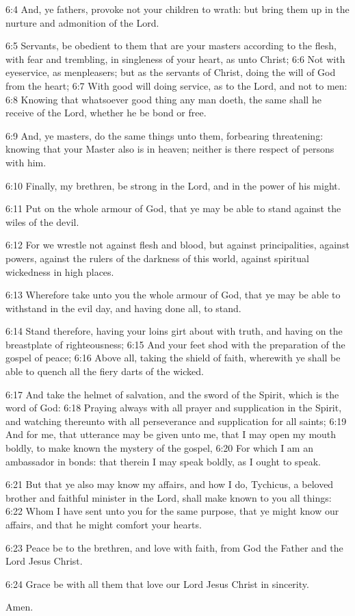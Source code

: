 6:4 And, ye fathers, provoke not your children to wrath: but bring them up in the nurture and admonition of the Lord.

6:5 Servants, be obedient to them that are your masters according to the flesh, with fear and trembling, in singleness of your heart, as unto Christ; 6:6 Not with eyeservice, as menpleasers; but as the servants of Christ, doing the will of God from the heart; 6:7 With good will doing service, as to the Lord, and not to men: 6:8 Knowing that whatsoever good thing any man doeth, the same shall he receive of the Lord, whether he be bond or free.

6:9 And, ye masters, do the same things unto them, forbearing threatening: knowing that your Master also is in heaven; neither is there respect of persons with him.

6:10 Finally, my brethren, be strong in the Lord, and in the power of his might.

6:11 Put on the whole armour of God, that ye may be able to stand against the wiles of the devil.

6:12 For we wrestle not against flesh and blood, but against principalities, against powers, against the rulers of the darkness of this world, against spiritual wickedness in high places.

6:13 Wherefore take unto you the whole armour of God, that ye may be able to withstand in the evil day, and having done all, to stand.

6:14 Stand therefore, having your loins girt about with truth, and having on the breastplate of righteousness; 6:15 And your feet shod with the preparation of the gospel of peace; 6:16 Above all, taking the shield of faith, wherewith ye shall be able to quench all the fiery darts of the wicked.

6:17 And take the helmet of salvation, and the sword of the Spirit, which is the word of God: 6:18 Praying always with all prayer and supplication in the Spirit, and watching thereunto with all perseverance and supplication for all saints; 6:19 And for me, that utterance may be given unto me, that I may open my mouth boldly, to make known the mystery of the gospel, 6:20 For which I am an ambassador in bonds: that therein I may speak boldly, as I ought to speak.

6:21 But that ye also may know my affairs, and how I do, Tychicus, a beloved brother and faithful minister in the Lord, shall make known to you all things: 6:22 Whom I have sent unto you for the same purpose, that ye might know our affairs, and that he might comfort your hearts.

6:23 Peace be to the brethren, and love with faith, from God the Father and the Lord Jesus Christ.

6:24 Grace be with all them that love our Lord Jesus Christ in sincerity.

Amen.

